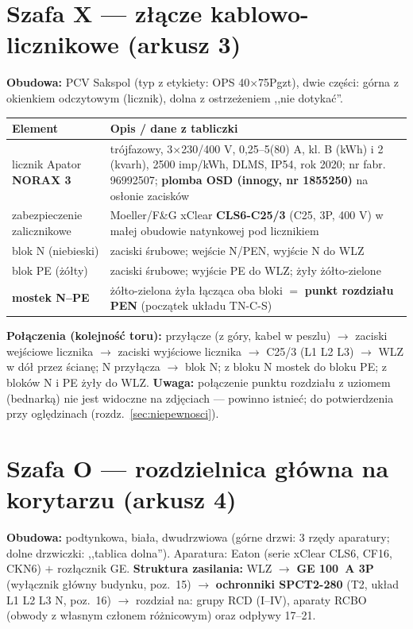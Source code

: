 \documentclass[11pt,a4paper]{article}
\begin{document}
\section{Szafa X --- złącze kablowo-licznikowe (arkusz 3)}
\textbf{Obudowa:} PCV Sakspol (typ z etykiety: OPS 40$\times$75Pgzt), dwie części: górna z okienkiem
odczytowym (licznik), dolna z ostrzeżeniem ,,nie dotykać''.
\begin{longtable}{@{}p{}p{}@{}}
\toprule
\textbf{Element} & \textbf{Opis / dane z tabliczki}\\
\midrule
licznik Apator \textbf{NORAX 3} & trójfazowy, 3$\times$230/400 V, 0,25--5(80) A, kl. B (kWh)
i 2 (kvarh), 2500 imp/kWh, DLMS, IP54, rok 2020; nr fabr. 96992507; \textbf{plomba OSD
(innogy, nr 1855250)} na osłonie zacisków\\
zabezpieczenie zalicznikowe & Moeller/F\&G xClear \textbf{CLS6-C25/3} (C25, 3P, 400 V) w małej
obudowie natynkowej pod licznikiem\\
blok N (niebieski) & zaciski śrubowe; wejście N/PEN, wyjście N do WLZ\\
blok PE (żółty) & zaciski śrubowe; wyjście PE do WLZ; żyły żółto-zielone\\
\textbf{mostek N--PE} & żółto-zielona żyła łącząca oba bloki $=$ \textbf{punkt rozdziału PEN}
(początek układu TN-C-S)\\
\bottomrule
\end{longtable}
\textbf{Połączenia (kolejność toru):} przyłącze (z góry, kabel w peszlu) $\to$ zaciski wejściowe
licznika $\to$ zaciski wyjściowe licznika $\to$ C25/3 (L1 L2 L3) $\to$ WLZ w dół przez ścianę;
N przyłącza $\to$ blok N; z bloku N mostek do bloku PE; z bloków N i PE żyły do WLZ.
\textbf{Uwaga:} połączenie punktu rozdziału z uziomem (bednarką) nie jest widoczne na zdjęciach
--- powinno istnieć; do potwierdzenia przy oględzinach (rozdz.~\ref{sec:niepewnosci}).

\section{Szafa O --- rozdzielnica główna na korytarzu (arkusz 4)}
\label{sec:szafaO}
\textbf{Obudowa:} podtynkowa, biała, dwudrzwiowa (górne drzwi: 3 rzędy aparatury; dolne drzwiczki:
,,tablica dolna''). Aparatura: Eaton (serie xClear CLS6, CF16, CKN6) $+$ rozłącznik GE.
\textbf{Struktura zasilania:} WLZ $\to$ \textbf{GE 100~A 3P} (wyłącznik główny budynku, poz.~15)
$\to$ \textbf{ochronniki SPCT2-280} (T2, układ L1 L2 L3 N, poz.~16) $\to$ rozdział na: grupy RCD
(I--IV), aparaty RCBO (obwody z własnym członem różnicowym) oraz odpływy 17--21.
\end{document}
